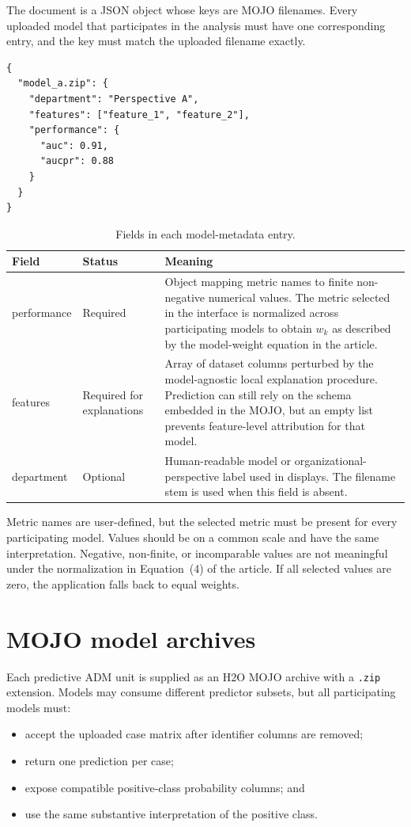 \documentclass[11pt,a4paper]{article}
\begin{document}
The document is a JSON object whose keys are MOJO filenames. Every uploaded model that participates in the analysis must have one corresponding entry, and the key must match the uploaded filename exactly.

\begin{lstlisting}[style=json]
{
  "model_a.zip": {
    "department": "Perspective A",
    "features": ["feature_1", "feature_2"],
    "performance": {
      "auc": 0.91,
      "aucpr": 0.88
    }
  }
}
\end{lstlisting}

\begin{table}[ht]
\centering
\caption{Fields in each model-metadata entry.}
\begin{tabularx}{\textwidth}{>{\ttfamily\raggedright\arraybackslash}p{2.8cm} >{\raggedright\arraybackslash}p{2cm} >{\raggedright\arraybackslash}X}
\toprule
\normalfont\textbf{Field} & \textbf{Status} & \textbf{Meaning} \\
\midrule
performance & Required & Object mapping metric names to finite non-negative numerical values. The metric selected in the interface is normalized across participating models to obtain $w_k$ as described by the model-weight equation in the article. \\
features & Required for explanations & Array of dataset columns perturbed by the model-agnostic local explanation procedure. Prediction can still rely on the schema embedded in the MOJO, but an empty list prevents feature-level attribution for that model. \\
department & Optional & Human-readable model or organizational-perspective label used in displays. The filename stem is used when this field is absent. \\
\bottomrule
\end{tabularx}
\end{table}

Metric names are user-defined, but the selected metric must be present for every participating model. Values should be on a common scale and have the same interpretation. Negative, non-finite, or incomparable values are not meaningful under the normalization in Equation~(4) of the article. If all selected values are zero, the application falls back to equal weights.

\section{MOJO model archives}

Each predictive ADM unit is supplied as an H2O MOJO archive with a \texttt{.zip} extension. Models may consume different predictor subsets, but all participating models must:
\begin{itemize}
  \item accept the uploaded case matrix after identifier columns are removed;
  \item return one prediction per case;
  \item expose compatible positive-class probability columns; and
  \item use the same substantive interpretation of the positive class.
\end{itemize}
\end{document}
